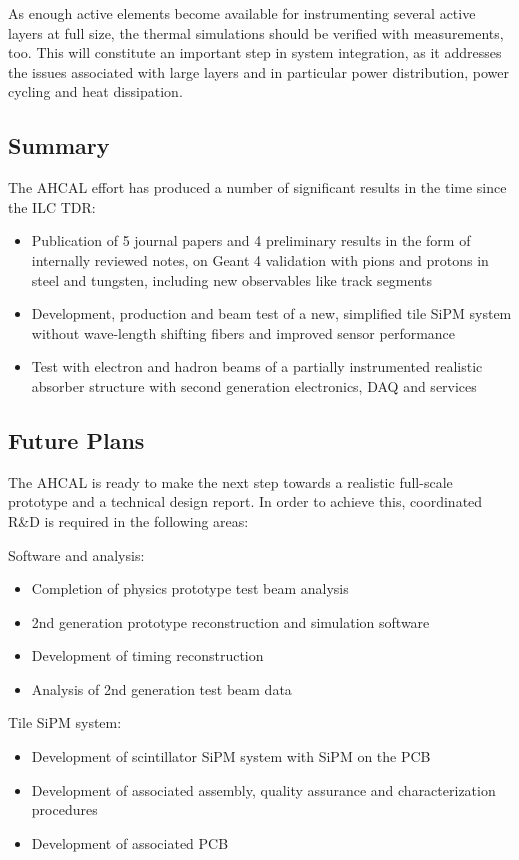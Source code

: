 As enough active elements become available for instrumenting several active layers at full size, the thermal simulations should be verified with measurements, too. This will constitute an important step in system integration, as it addresses the issues associated with large layers and in particular power distribution, power cycling and heat dissipation.

\subsection{Summary}
The AHCAL effort has produced a number of significant results in the time since the ILC TDR:
\begin{itemize}
\item Publication of 5 journal papers and 4 preliminary results in the form of internally reviewed notes, on Geant 4 validation with pions and protons in steel and tungsten, including new observables like track segments
\item Development, production and beam test of a new, simplified tile SiPM system without wave-length shifting fibers and improved sensor performance
\item Test with electron and hadron beams of a partially instrumented realistic absorber structure  with second generation electronics, DAQ and services
\end{itemize}

\subsection{Future Plans}

The AHCAL is ready to make the next step towards a realistic full-scale prototype and a technical design report. In order to achieve this, coordinated R\&D is required in the following areas:

Software and analysis:
\begin{itemize}
\item Completion of physics prototype test beam analysis
\item 2nd generation prototype reconstruction and simulation software
\item Development of timing reconstruction
\item Analysis of 2nd generation test beam data
\end{itemize}

Tile SiPM system:
\begin{itemize}
\item Development of scintillator SiPM system with SiPM on the PCB
\item Development of associated assembly, quality assurance and characterization procedures
\item Development of associated PCB
\end{itemize}

